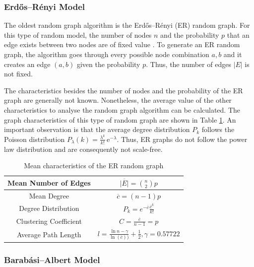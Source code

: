 \subsubsection{Erdős–Rényi Model}

The oldest random graph algorithm is the 
Erdős–Rényi (ER) random graph. For this type of random model, the
number of nodes $n$ and the probability $p$ that an 
edge exists between two nodes are of fixed value \cite{basicnetwork}. 
To generate an ER random graph, the algorithm goes through 
every possible node combination $a, b$ and it creates an edge 
$(a, b)$ given the probability $p$. 
Thus, the number of edges $|E|$ is not fixed.

The characteristics besides the number of nodes and the
probability of the ER graph are generally not known.
Nonetheless, the average value of the other
characteristics to analyse the random graph algorithm can be calculated.
The graph characteristics of this type of random graph are shown in Table 
\ref{erdos-model}.
An important observation is that 
the average degree distribution $P_k$ follows the Poisson distribution
$P_\lambda (k) = \frac{\lambda^k}{k!}\, \mathrm{e}^{-\lambda}$. Thus,
ER graphs do not follow the power law distribution and are consequently
not scale-free. 

\begin{table}[ht!]
    \centering
    \begin{tabular}{|c | c |} 
     \hline
     Mean Number of Edges & 
     $\overline{|E|} = \binom{n}{2}p$  \\ 
     \hline
     Mean Degree & 
     $\overline{c} = (n-1)p$ \\ 
     \hline
     Degree Distribution & 
     $P_k = e^{-\overline{c}} \frac{\overline{c}^k}{k!}$ \\ 
     \hline
     Clustering Coefficient & 
     $C=\frac{\overline{c}}{n-1}=p$ \\ 
     \hline
     Average Path Length \cite{averagepath}& 
     $l = \frac{\ln{n} - \gamma}{\ln(\overline{c}))} + \frac{1}{2}, 
     \gamma=0.57722$ \\ 
     \hline
    \end{tabular}
    \caption{Mean characteristics of the ER random graph \cite{basicnetwork}}
    \label{erdos-model}
\end{table}

\subsubsection{Barabási–Albert Model}

